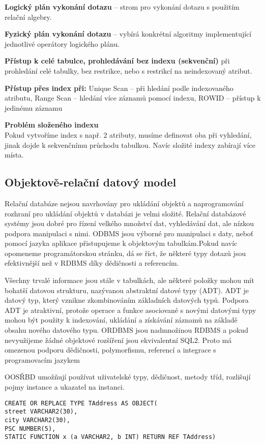\textbf{Logický plán vykonání dotazu} -- strom pro vykonání dotazu s použitím relační algebry.

\textbf{Fyzický plán vykonání dotazu} -- vybírá konkrétní algoritmy implementující jednotlivé operátory logického plánu.


\textbf{Přístup k celé tabulce, prohledávání bez indexu (sekvenční)} při prohledání celé tabulky, bez restrikce, nebo s restrikcí na neindexovaný atribut.

\textbf{Přístup přes index při:} Unique Scan – při hledání podle indexovaného atributu, Range Scan – hledání více záznamů pomocí indexu, ROWID – přístup k jedinému záznamu

\textbf{Problém složeného indexu}\\
Pokud vytvoříme index s např. 2 atributy, musíme definovat oba při vyhledání, jinak dojde k sekvenčnímu průchodu tabulkou. Navíc složité indexy zabírají více místa.

\subsection{Objektově‐relační datový model}
Relační databáze nejsou navrhovány pro ukládání objektů a naprogramování rozhraní pro ukládání objektů v databázi je velmi složité.
Relační databázové systémy jsou dobré pro řízení velkého množství dat, vyhledávání dat, ale nízkou podpora manipulaci s nimi. 
ODBMS jsou výborné pro manipulaci s daty, neboť pomocí jazyka aplikace přistupujeme k objektovým tabulkám.Pokud navíc opomeneme programátorskou stránku, dá se říct, že některé typy dotazů jsou efektivnější než v RDBMS díky dědičnosti a referencím. 

Všechny trvalé informace jsou stále v tabulkách, ale některé položky mohou mít bohatší datovou strukturu, nazývanou abstraktní datové typy (ADT). ADT je datový typ, který vznikne zkombinováním základních datových typů. Podpora ADT je atraktivní, protože operace a funkce asociované s novými datovými typy mohou být použity k indexování, ukládání a získávání záznamů na základě obsahu nového datového typu. ORDBMS jsou nadmnožinou RDBMS a pokud nevyužijeme žádné objektové rozšíření jsou ekvivalentní SQL2. Proto má omezenou podporu dědičnosti, polymorfismu, referencí a integrace s programovacím jazykem

OOSŘBD umožňují používat uživatelské typy, dědičnost, metody tříd, rozlišují pojmy instance a ukazatel na instanci. 
\begin{lstlisting}
CREATE OR REPLACE TYPE TAddress AS OBJECT(
street VARCHAR2(30), 
city VARCHAR2(30), 
PSC NUMBER(5),
STATIC FUNCTION x (a VARCHAR2, b INT) RETURN REF TAddress)
\end{lstlisting}

